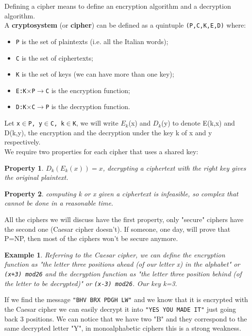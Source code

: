 \documentclass[a4paper, 12pt]{report}
\newtheorem{property}{\textbf{Property}}
\newtheorem{example}{\textbf{Example}}
\begin{document}
Defining a cipher means to define an encryption algorithm and a decryption algorithm.\\
A \textbf{cryptosystem} (or \textbf{cipher}) can be defined as a quintuple \texttt{(P,C,K,E,D)} where:
\begin{itemize}
	\item \texttt{P} is the set of plaintexts (i.e. all the Italian words);
	\item \texttt{C} is the set of ciphertexts;
	\item \texttt{K} is the set of keys (we can have more than one key);
	\item \texttt{E:K$\times$P$\rightarrow$C} is the encryption function;
	\item \texttt{D:K$\times$C$\rightarrow$P} is the decryption function.
\end{itemize}
Let \texttt{x$\in$P, y$\in$C, k$\in$K}, we will write $E_k$(x) and $D_k$(y) to denote E(k,x) and D(k,y), the encryption and the decryption under the key k of x and y respectively.\\

We require two properties for each cipher that uses a shared key:
\begin{property}
	$D_k(E_k(x)) = x$, decrypting a ciphertext with the right key gives the original plaintext.
\end{property}
\begin{property}
	computing k or x given a ciphertext is infeasible, so complex that cannot be done in a reasonable time.
\end{property}

All the ciphers we will discuss have the first property, only "secure" ciphers have the second one (Caesar cipher doesn't). If someone, one day, will prove that P=NP, then most of the ciphers won't be secure anymore.

\begin{example}
	Referring to the Caesar cipher, we can define the encryption function as "the letter three positions ahead (of our letter x) in the alphabet" or \texttt{(x+3) mod26} and the decryption function as "the letter three position behind (of the letter to be decrypted)" or \texttt{(x-3) mod26}. Our key k=3.
\end{example}

If we find the message \texttt{"BHV BRX PDGH LW"} and we know that it is encrypted with the Caesar cipher we can easily decrypt it into \texttt{"YES YOU MADE IT"} just going back 3 positions. We can notice that we have two "B" and they correspond to the same decrypted letter "Y", in monoalphabetic ciphers this is a strong weakness.
\end{document}
